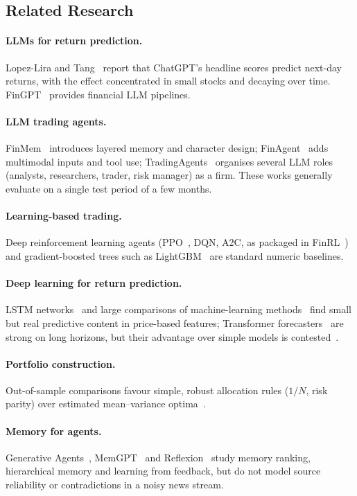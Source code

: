 \subsection{Related Research}
\paragraph{LLMs for return prediction.} Lopez-Lira and Tang~\cite{lopezlira2023chatgpt} report that ChatGPT's headline scores predict next-day returns, with the effect concentrated in small stocks and decaying over time. FinGPT~\cite{yang2023fingpt} provides financial LLM pipelines.
\paragraph{LLM trading agents.} FinMem~\cite{yu2023finmem} introduces layered memory and character design; FinAgent~\cite{zhang2024finagent} adds multimodal inputs and tool use; TradingAgents~\cite{xiao2024tradingagents} organises several LLM roles (analysts, researchers, trader, risk manager) as a firm. These works generally evaluate on a single test period of a few months.
\paragraph{Learning-based trading.} Deep reinforcement learning agents (PPO~\cite{schulman2017ppo}, DQN, A2C, as packaged in FinRL~\cite{liu2020finrl}) and gradient-boosted trees such as LightGBM~\cite{ke2017lightgbm} are standard numeric baselines.
\paragraph{Deep learning for return prediction.} LSTM networks~\cite{fischer2018lstm} and large comparisons of machine-learning methods~\cite{gu2020ml} find small but real predictive content in price-based features; Transformer forecasters~\cite{lim2021tft,nie2023patchtst} are strong on long horizons, but their advantage over simple models is contested~\cite{zeng2023transformers}.
\paragraph{Portfolio construction.} Out-of-sample comparisons favour simple, robust allocation rules ($1/N$, risk parity) over estimated mean--variance optima~\cite{demiguel2009naive,maillard2010erc}.
\paragraph{Memory for agents.} Generative Agents~\cite{park2023generative}, MemGPT~\cite{packer2023memgpt} and Reflexion~\cite{shinn2023reflexion} study memory ranking, hierarchical memory and learning from feedback, but do not model source reliability or contradictions in a noisy news stream.

